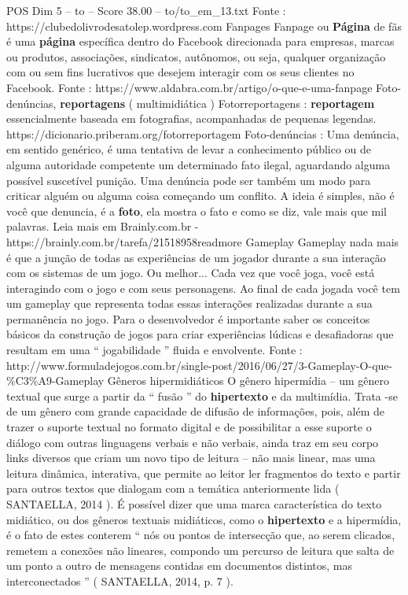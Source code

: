 \begin{textsample}{POS Dim 5 – to – Score 38.00 – to/to\_em\_13.txt}
Fonte : https://clubedolivrodesatolep.wordpress.com Fanpages Fanpage ou \textbf{Página} de fãs é uma \textbf{página} específica dentro do Facebook direcionada para empresas, marcas ou produtos, associações, sindicatos, autônomos, ou seja, qualquer organização com ou sem fins lucrativos que desejem interagir com os seus clientes no Facebook.
Fonte : https://www.aldabra.com.br/artigo/o-que-e-uma-fanpage Foto-denúncias, \textbf{reportagens} ( multimidiática ) Fotorreportagens : \textbf{reportagem} essencialmente baseada em fotografias, acompanhadas de pequenas legendas. https://dicionario.priberam.org/fotorreportagem Foto-denúncias : Uma denúncia, em sentido genérico, é uma tentativa de levar a conhecimento público ou de alguma autoridade competente um determinado fato ilegal, aguardando alguma possível suscetível punição.
Uma denúncia pode ser também um modo para criticar alguém ou alguma coisa começando um conflito.
A ideia é simples, não é você que denuncia, é a \textbf{foto}, ela mostra o fato e como se diz, vale mais que mil palavras.
Leia mais em Brainly.com.br - https://brainly.com.br/tarefa/21518958readmore Gameplay Gameplay nada mais é que a junção de todas as experiências de um jogador durante a sua interação com os sistemas de um jogo.
Ou melhor...
Cada vez que você joga, você está interagindo com o jogo e com seus personagens.
Ao final de cada jogada você tem um gameplay que representa todas essas interações realizadas durante a sua permanência no jogo.
Para o desenvolvedor é importante saber os conceitos básicos da construção de jogos para criar experiências lúdicas e desafiadoras que resultam em uma “ jogabilidade ” fluida e envolvente.
Fonte : http://www.formuladejogos.com.br/single-post/2016/06/27/3-Gameplay-O-que-\%C3\%A9-Gameplay Gêneros hipermidiáticos O gênero hipermídia – um gênero textual que surge a partir da “ fusão ” do \textbf{hipertexto} e da multimídia.
Trata -se de um gênero com grande capacidade de difusão de informações, pois, além de trazer o suporte textual no formato digital e de possibilitar a esse suporte o diálogo com outras linguagens verbais e não verbais, ainda traz em seu corpo links diversos que criam um novo tipo de leitura – não mais linear, mas uma leitura dinâmica, interativa, que permite ao leitor ler fragmentos do texto e partir para outros textos que dialogam com a temática anteriormente lida ( SANTAELLA, 2014 ).
É possível dizer que uma marca característica do texto midiático, ou dos gêneros textuais midiáticos, como o \textbf{hipertexto} e a hipermídia, é o fato de estes conterem “ nós ou pontos de intersecção que, ao serem clicados, remetem a conexões não lineares, compondo um percurso de leitura que salta de um ponto a outro de mensagens contidas em documentos distintos, mas interconectados ” ( SANTAELLA, 2014, p. 7 ).

\end{textsample}
